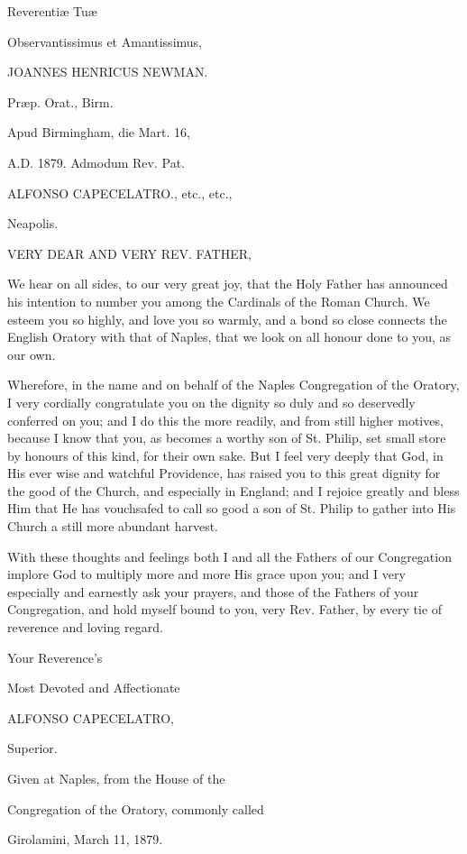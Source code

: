 Reverentiæ Tuæ

Observantissimus et Amantissimus,

JOANNES HENRICUS NEWMAN.

Præp. Orat., Birm.

Apud Birmingham, die Mart. 16,

A.D. 1879. Admodum Rev. Pat.

ALFONSO CAPECELATRO.,
etc., etc.,

Neapolis.


VERY DEAR AND
VERY REV. FATHER,

We hear on all sides, to our very great joy, that the Holy Father has
announced his intention to number you among the Cardinals of the Roman
Church. We esteem you so highly, and love you so warmly, and a bond so
close connects the English Oratory with that of Naples, that we look
on all honour done to you, as our own.

Wherefore, in the name and on behalf of the Naples Congregation of
the Oratory, I very cordially congratulate you on the dignity so duly
and so deservedly conferred on you; and I do this the more readily,
and from still higher motives, because I know that you, as becomes a
worthy son of St. Philip, set small store by honours of this kind, for
their own sake. But I feel very deeply that God, in His ever wise and
watchful Providence, has raised you to this great dignity for the good
of the Church, and especially in England; and I rejoice greatly and
bless Him that He has vouchsafed to call so good a son of St. Philip
to gather into His Church a still more abundant harvest.

With these thoughts and feelings both I and all the Fathers of our
Congregation implore God to multiply more and more His grace upon you;
and I very especially and earnestly ask your prayers, and those of the Fathers of your Congregation, and hold myself bound to you,
very Rev. Father, by every tie of reverence and loving regard.

Your Reverence's

Most Devoted and Affectionate

ALFONSO CAPECELATRO,

Superior.

Given at Naples, from the House of the

Congregation of the Oratory, commonly called

Girolamini, March 11, 1879.

